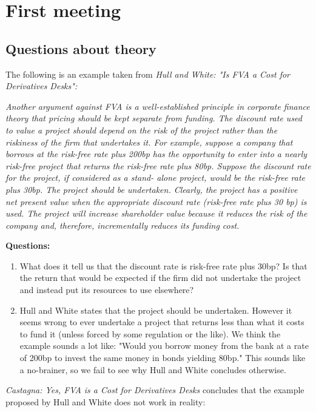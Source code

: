 \documentclass[10pt,a4paper]{article}
\begin{document}
    \section{First meeting}   
    \subsection{Questions about theory} 
        The following is an example taken from \textit{Hull and White: "Is FVA a Cost for Derivatives Desks":}

        \textit{Another argument against FVA is a well-established principle in corporate finance theory that pricing should be kept separate from funding. The discount rate used to value a project should depend on the risk of the project rather than the riskiness of the firm that undertakes it. For example, suppose a company that borrows at the risk-free rate plus 200bp has the opportunity to enter into a nearly risk-free project that returns the risk-free rate plus 80bp. Suppose the discount rate for the project, if considered as a stand- alone project, would be the risk-free rate plus 30bp. The project should be undertaken. Clearly, the project has a positive net present value when the appropriate discount rate (risk-free rate plus 30 bp) is used. The project will increase shareholder value because it reduces the risk of the company and, therefore, incrementally reduces its funding cost.}

        \textbf{Questions:}
        \begin{enumerate}
            \item What does it tell us that the discount rate is risk-free rate plus 30bp? Is that the return that would be expected if the firm did not undertake the project and instead put its resources to use elsewhere?
            \item Hull and White states that the project should be undertaken. However it seems wrong to ever undertake a project that returns less than what it costs to fund it (unless forced by some regulation or the like). We think the example sounds a lot like: "Would you borrow money from the bank at a rate of 200bp to invest the same money in bonds yielding 80bp." This sounds like a no-brainer, so we fail to see why Hull and White concludes otherwise.  
        \end{enumerate}

        \textit{Castagna: Yes, FVA is a Cost for Derivatives Desks} concludes that the example proposed by Hull and White does not work in reality:
\end{document}
